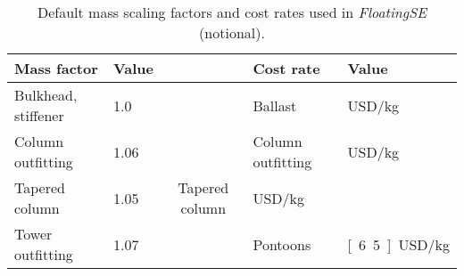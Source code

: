 \begin{table}[htbp]
  \begin{center}
    {\small
      \caption{Default mass scaling factors and cost rates used in
        \textit{FloatingSE} (notional).}
      \label{tbl:factors}
      \begin{tabular}{llcll}
        \textbf{Mass factor} & \textbf{Value} && \textbf{Cost rate} & \textbf{Value} \\
        \hline \hline
        Bulkhead, stiffener & 1.0 && Ballast & \unit[100]{USD/kg} \\
        Column outfitting & 1.06 && Column outfitting & \unit[6,980]{USD/kg} \\
        Tapered column & 1.05 & Tapered column & \unit[4,720]{USD/kg} \\
        Tower outfitting & 1.07 && Pontoons & \unit[6.5]{USD/kg} \\
        \hline
      \end{tabular}
    }
  \end{center}
\end{table}
